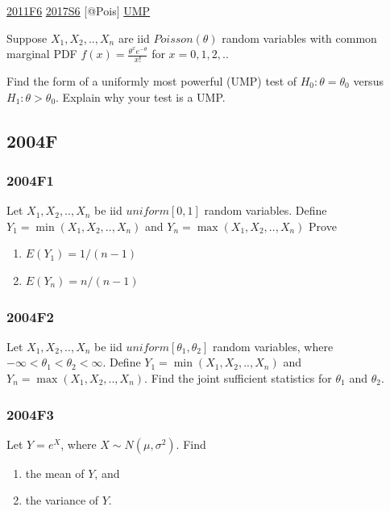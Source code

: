 \documentclass[10pt,twocolumn,portrait]{article}
\begin{document}
\protect\hyperlink{f6-4}{2011F6} \protect\hyperlink{s6-4}{2017S6}
{[}@Pois{]} \protect\hyperlink{section-7}{UMP}

Suppose \(X_1,X_2,..,X_n\) are iid \(Poisson(\theta)\) random variables
with common marginal PDF \(f(x)=\frac{\theta^xe^{-\theta}}{x!}\) for
\(x = 0,1,2,..\)

Find the form of a uniformly most powerful (UMP) test of
\(H_0:\theta=\theta_0\) versus \(H_1:\theta>\theta_0\). Explain why your
test is a UMP.

\hypertarget{f-2}{%
\subsection{2004F}\label{f-2}}

\hypertarget{f1-2}{%
\subsubsection{2004F1}\label{f1-2}}

Let \(X_1,X_2,..,X_n\) be iid \(uniform[0,1]\) random variables. Define
\(Y_1=\min(X_1,X_2,..,X_n)\) and \(Y_n=\max(X_1,X_2,..,X_n)\) Prove

\begin{enumerate}
\def\labelenumi{(\alph{enumi})}
\item
  \(E(Y_1) =1/(n-1)\)
\item
  \(E(Y_n) =n/(n-1)\)
\end{enumerate}

\hypertarget{f2-2}{%
\subsubsection{2004F2}\label{f2-2}}

Let \(X_1,X_2,..,X_n\) be iid \(uniform[\theta_1,\theta_2]\) random
variables, where \(-\infty<\theta_1<\theta_2<\infty\). Define
\(Y_1=\min(X_1,X_2,..,X_n)\) and \(Y_n=\max(X_1,X_2,..,X_n)\). Find the
joint sufficient statistics for \(\theta_1\) and \(\theta_2\).

\hypertarget{f3-2}{%
\subsubsection{2004F3}\label{f3-2}}

Let \(Y=e^X\), where \(X\sim N(\mu,\sigma^2)\). Find

\begin{enumerate}
\def\labelenumi{(\alph{enumi})}
\item
  the mean of \(Y\), and
\item
  the variance of \(Y\).
\end{enumerate}
\end{document}
